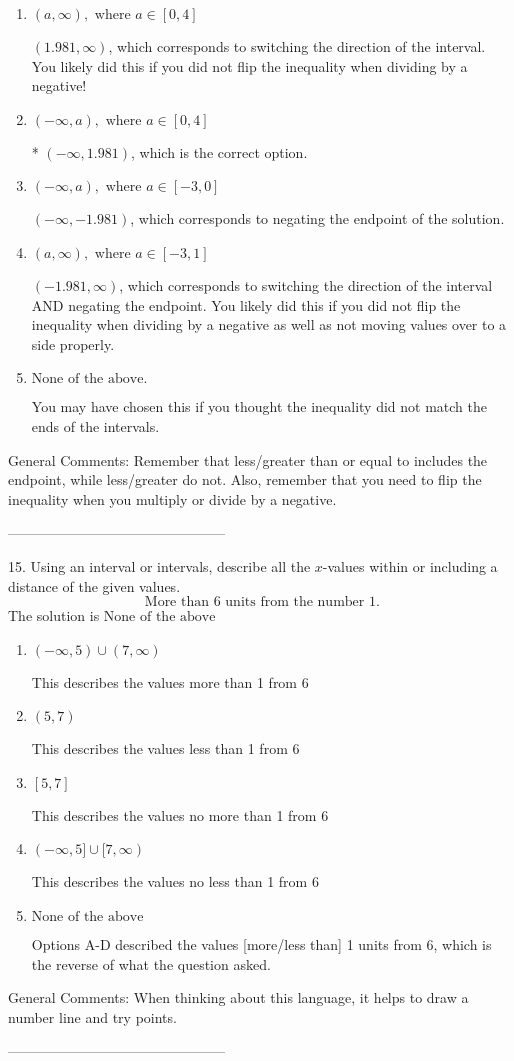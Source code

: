 \documentclass{extbook}[14pt]
\begin{document}
\begin{enumerate}[label=\Alph*.] 
\item $ (a, \infty), \text{ where } a \in [0, 4] $ 

  $(1.981, \infty)$, which corresponds to switching the direction of the interval. You likely did this if you did not flip the inequality when dividing by a negative! 
\item $ (-\infty, a), \text{ where } a \in [0, 4] $ 

 * $(-\infty, 1.981)$, which is the correct option. 
\item $ (-\infty, a), \text{ where } a \in [-3, 0] $ 

  $(-\infty, -1.981)$, which corresponds to negating the endpoint of the solution. 
\item $ (a, \infty), \text{ where } a \in [-3, 1] $ 

  $(-1.981, \infty)$, which corresponds to switching the direction of the interval AND negating the endpoint. You likely did this if you did not flip the inequality when dividing by a negative as well as not moving values over to a side properly. 
\item $ \text{None of the above}. $ 

 You may have chosen this if you thought the inequality did not match the ends of the intervals. 
\end{enumerate} 
 
General Comments: Remember that less/greater than or equal to includes the endpoint, while less/greater do not. Also, remember that you need to flip the inequality when you multiply or divide by a negative.

-----------------------------------------------

15. Using an interval or intervals, describe all the $x$-values within or including a distance of the given values.
\[ \text{ More than } 6 \text{ units from the number } 1. \] 
The solution is $ \text{None of the above} $ 

\begin{enumerate}[label=\Alph*.] 
\item $ (-\infty, 5) \cup (7, \infty) $ 

 This describes the values more than 1 from 6 
\item $ (5, 7) $ 

 This describes the values less than 1 from 6 
\item $ [5, 7] $ 

 This describes the values no more than 1 from 6 
\item $ (-\infty, 5] \cup [7, \infty) $ 

 This describes the values no less than 1 from 6 
\item $ \text{None of the above} $ 

 Options A-D described the values [more/less than] 1 units from 6, which is the reverse of what the question asked. 
\end{enumerate} 
 
General Comments: When thinking about this language, it helps to draw a number line and try points.

-----------------------------------------------
\end{document}
